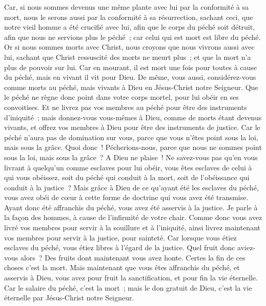 \begin{multicols}{2}
Car, si nous sommes devenus une même plante avec lui par la conformité à sa mort, nous le serons aussi par la conformité à sa résurrection,
sachant ceci, que notre vieil homme a été crucifié avec lui, afin que le corps du péché soit détruit, afin que nous ne servions plus le péché~;
car celui qui est mort est libre du péché.
Or si nous sommes morts avec Christ, nous croyons que nous vivrons aussi avec lui,
sachant que Christ ressuscité des morts ne meurt plus~; et que la mort n'a plus de pouvoir sur lui.
Car en mourant, il est mort une fois pour toutes à cause du péché, mais en vivant il vit pour Dieu.
De même, vous aussi, considérez-vous comme morts au péché, mais vivants à Dieu en Jésus-Christ notre Seigneur.
Que le péché ne règne donc point dans votre corps mortel, pour lui obéir en ses convoitises.
Et ne livrez pas vos membres au péché pour être des instruments d'iniquité~; mais donnez-vous vous-mêmes à Dieu, comme de morts étant devenus vivants, et offrez vos membres à Dieu pour être des instruments de justice.
Car le péché n'aura pas de domination sur vous, parce que vous n'êtes point sous la loi, mais sous la grâce.
Quoi donc~! Pécherions-nous, parce que nous ne sommes point sous la loi, mais sous la grâce~? A Dieu ne plaise~!
Ne savez-vous pas qu'en vous livrant à quelqu'un comme esclaves pour lui obéir, vous êtes esclaves de celui à qui vous obéissez, soit du péché qui conduit à la mort, soit de l'obéissance qui conduit à la justice~?
Mais grâce à Dieu de ce qu'ayant été les esclaves du péché, vous avez obéi de cœur à cette forme de doctrine qui vous avez été transmise.
Ayant donc été affranchis du péché, vous avez été asservis à la justice.
Je parle à la façon des hommes, à cause de l'infirmité de votre chair. Comme donc vous avez livré vos membres pour servir à la souillure et à l'iniquité, ainsi livrez maintenant vos membres pour servir à la justice, pour sainteté.
Car lorsque vous étiez esclaves du péché, vous étiez libres à l'égard de la justice.
Quel fruit donc aviez-vous alors~? Des fruits dont maintenant vous avez honte. Certes la fin de ces choses c'est la mort.
Mais maintenant que vous êtes affranchis du péché, et asservis à Dieu, vous avez pour fruit la sanctification, et pour fin la vie éternelle.
Car le salaire du péché, c'est la mort~; mais le don gratuit de Dieu, c'est la vie éternelle par Jésus-Christ notre Seigneur.

\end{multicols}
